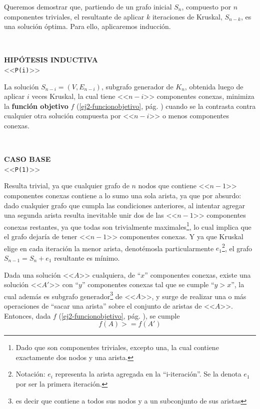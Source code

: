 \documentclass[11pt, a4paper, twoside]{article}
\begin{document}
Queremos demostrar que, partiendo de un grafo inicial $S_{n}$, compuesto por
$n$ componentes triviales, el resultante de aplicar $k$ iteraciones de
Kruskal, $S_{n-k}$, es una solución óptima. Para ello, aplicaremos inducción.

\begin{paragraph}\
%
%
\begin{center}
\textbf{HIPÓTESIS INDUCTIVA}\\
<<\texttt{P(i)}>>
\end{center}

La solución $S_{n-i}=(V,E_{n-i})$, subgrafo generador de $K_n$, obtenida luego
de aplicar $i$ veces Kruskal, la cual tiene <<$n-i$>> componentes conexas,
minimiza la \textbf{función objetivo} $f$ (\ref{ej2-funcionobjetivo}, pág.
\pageref{ej2-funcionobjetivo}) cuando se la contrasta contra cualquier otra
solución compuesta por <<$n-i$>> o menos componentes conexas.

\end{paragraph}

\begin{paragraph}\
%
%
\begin{center}
\textbf{CASO BASE}\\
<<\texttt{P(1)}>>
\end{center}

Resulta trivial, ya que cualquier grafo de $n$ nodos que contiene <<$n-1$>>
componentes conexas contiene a lo sumo una sola arista, ya que por absurdo:
dado cualquier grafo que cumpla las condiciones anteriores, al intentar
agregar una segunda arista resulta inevitable unir dos de las <<$n-1$>>
componentes conexas restantes, ya que todas son trivialmente
maximales\footnote{Dado que son componentes triviales, excepto una, la cual
contiene exactamente dos nodos y una arista.}, lo cual implica que el grafo
dejaría de tener <<$n-1$>> componentes conexas. Y ya que Kruskal elige en cada
iteración la menor arista, denotémosla particularmente
$e_{1}$\footnote{Notación: $e_{i}$ representa la arista agregada en la
``i-iteración''. Se la denota $e_{1}$ por ser la primera iteración.}, el grafo
$S_{n-1} = S_{n} + e_{1}$ resultante es mínimo.

\end{paragraph}

\begin{lema}\label{lema:ej3-1}
Dada una solución <<$A$>> cualquiera, de ``$x$'' componentes conexas, existe
una solución <<$A'$>> con ``$y$'' componentes conexas tal que se cumple
``$y>x$'', la cual además es subgrafo generador\footnote{es decir que contiene
a todos sus nodos y a un subconjunto de sus aristas} de <<$A$>>, y surge de
realizar una o más operaciones de ``sacar una arista'' sobre el conjunto de
aristas de <<$A$>>. Entonces, dada $f$ (\ref{ej2-funcionobjetivo}, pág.
\pageref{ej2-funcionobjetivo}), se cumple
\[
f(A) >= f(A')
\]
\end{lema}
\end{document}
